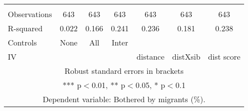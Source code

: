 \begin{tabular}{lcccccc}
 &  &  &  &  &  &  \\
Observations & 643 & 643 & 643 & 643 & 643 & 643 \\
R-squared & 0.022 & 0.166 & 0.241 & 0.236 & 0.181 & 0.238 \\
Controls & None & All & Inter &  &  &  \\
 IV &  &  &  & distance & distXsib & dist score \\ \hline
\multicolumn{7}{c}{ Robust standard errors in brackets} \\
\multicolumn{7}{c}{ *** p$<$0.01, ** p$<$0.05, * p$<$0.1} \\
\multicolumn{7}{c}{ Dependent variable: Bothered by migrants (\%).} \\
\end{tabular}
